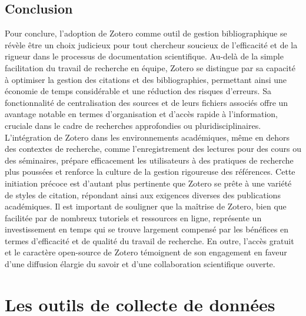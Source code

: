 \documentclass[
  letterpaper,
]{scrbook}
\begin{document}
\hypertarget{conclusion-4}{%
\section{Conclusion}\label{conclusion-4}}

Pour conclure, l'adoption de Zotero comme outil de gestion
bibliographique se révèle être un choix judicieux pour tout chercheur
soucieux de l'efficacité et de la rigueur dans le processus de
documentation scientifique. Au-delà de la simple facilitation du travail
de recherche en équipe, Zotero se distingue par sa capacité à optimiser
la gestion des citations et des bibliographies, permettant ainsi une
économie de temps considérable et une réduction des risques d'erreurs.
Sa fonctionnalité de centralisation des sources et de leurs fichiers
associés offre un avantage notable en termes d'organisation et d'accès
rapide à l'information, cruciale dans le cadre de recherches
approfondies ou pluridisciplinaires. L'intégration de Zotero dans les
environnements académiques, même en dehors des contextes de recherche,
comme l'enregistrement des lectures pour des cours ou des séminaires,
prépare efficacement les utilisateurs à des pratiques de recherche plus
poussées et renforce la culture de la gestion rigoureuse des références.
Cette initiation précoce est d'autant plus pertinente que Zotero se
prête à une variété de styles de citation, répondant ainsi aux exigences
diverses des publications académiques. Il est important de souligner que
la maîtrise de Zotero, bien que facilitée par de nombreux tutoriels et
ressources en ligne, représente un investissement en temps qui se trouve
largement compensé par les bénéfices en termes d'efficacité et de
qualité du travail de recherche. En outre, l'accès gratuit et le
caractère open-source de Zotero témoignent de son engagement en faveur
d'une diffusion élargie du savoir et d'une collaboration scientifique
ouverte.

\hypertarget{section}{%
\subsection{}\label{section}}


\hypertarget{les-outils-de-collecte-de-donnuxe9es}{%
\chapter{Les outils de collecte de
données}\label{les-outils-de-collecte-de-donnuxe9es}}
\end{document}
